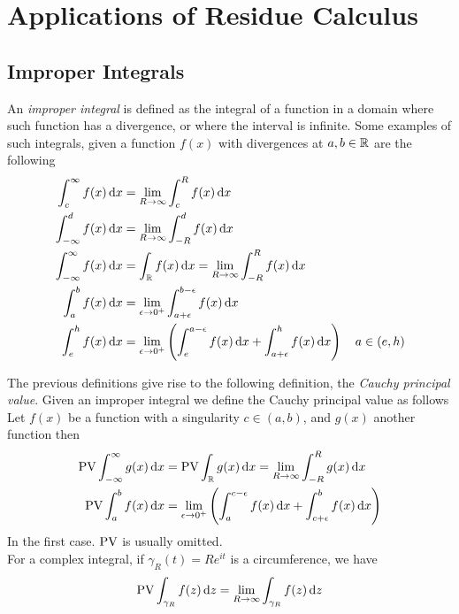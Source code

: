 \documentclass[../complete.tex]{subfiles}
\begin{document}
\section{Applications of Residue Calculus}
\subsection{Improper Integrals}
\begin{dfn}
	An \textit{improper integral} is defined as the integral of a function in a domain where such function has a divergence, or where the interval is infinite.
	Some examples of such integrals, given a function $f(x)$ with divergences at $a,b\in\mathbb{R}$ are the following
	\begin{equation*}
		\begin{aligned}
			\int_{c}^{\infty}f(x)\diff x&=\lim_{R\to\infty}\int_{c}^{R}f(x)\diff x\\
			\int_{-\infty}^{d}f(x)\diff x&=\lim_{R\to\infty}\int_{-R}^{d}f(x)\diff x\\
			\int_{-\infty}^{\infty}f(x)\diff x&=\int_{\R}^{}f(x)\diff x=\lim_{R\to\infty}\int_{-R}^{R}f(x)\diff x\\
			\int_{a}^{b}f(x)\diff x&=\lim_{\epsilon\to0^+}\int_{a+\epsilon}^{b-\epsilon}f(x)\diff x\\
			\int_{e}^h f(x)\diff x&=\lim_{\epsilon\to0^+}\left( \int_{e}^{a-\epsilon}f(x)\diff x+\int_{a+\epsilon}^{h}f(x)\diff x \right)\quad a\in(e,h)
		\end{aligned}
	\end{equation*}
\end{dfn}
\begin{dfn}
	The previous definitions give rise to the following definition, the \textit{Cauchy principal value}. Given an improper integral we define the Cauchy principal value as follows\\
	Let $f(x)$ be a function with a singularity $c\in(a,b)$, and $g(x)$ another function then
	\begin{equation*}
		\begin{aligned}
			\operatorname{\mathrm{PV}}\int_{-\infty}^{\infty}g(x)\operatorname{d\!} x&=\operatorname{\mathrm{PV}}\int_{\mathbb{R}}^{}g(x)\operatorname{d\!} x=\lim_{R\to\infty}\int_{-R}^{R}g(x)\operatorname{d\!} x\\
			\operatorname{\mathrm{PV}}\int_{a}^{b}f(x)\operatorname{d\!} x&=\lim_{\epsilon\to0^+}\left(\int_{a}^{c-\epsilon}f(x)\operatorname{d\!} x+\int_{c+\epsilon}^{b}f(x)\operatorname{d\!} x\right)
		\end{aligned}
	\end{equation*}
	In the first case. $\operatorname{\mathrm{PV}}$ is usually omitted.\\
	For a complex integral, if $\gamma_R(t)=Re^{it}$ is a circumference, we have
	\begin{equation*}
		\operatorname{\mathrm{PV}}\int_{\gamma_R}^{}f(z)\operatorname{d\!} z=\lim_{R\to\infty}\int_{\gamma_R}f(z)\operatorname{d\!} z
	\end{equation*}
\end{dfn}
\end{document}
